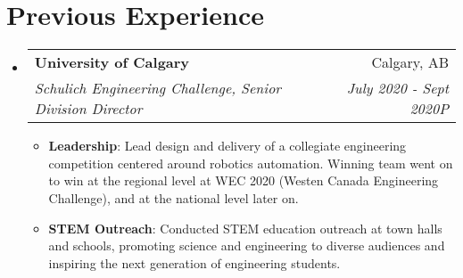 \documentclass[letterpaper,11pt]{article}
\makeatletter
\newcommand{\resumeItem}[2]{
  \item\small{
    \textbf{#1}{: #2 \vspace{-2pt}}
  }
}
\newcommand{\resumeSubheading}[4]{
  \vspace{-1pt}\item
    \begin{tabular*}{0.97\textwidth}[t]{l@{\extracolsep{\fill}}r}
      \textbf{#1} & #2 \\
      \textit{\small#3} & \textit{\small #4} \\
    \end{tabular*}\vspace{-5pt}
}
\newcommand{\resumeSubHeadingListStart}{\begin{itemize}[leftmargin=*]}
\newcommand{\resumeSubHeadingListEnd}{\end{itemize}}
\newcommand{\resumeItemListStart}{\begin{itemize}}
\newcommand{\resumeItemListEnd}{\end{itemize}\vspace{-5pt}}
\makeatother
\begin{document}
\section{Previous Experience}
  \resumeSubHeadingListStart
    \resumeSubheading
      {University of Calgary}{Calgary, AB}
      {Schulich Engineering Challenge, Senior Division Director}{July 2020 - Sept 2020P}
      \resumeItemListStart
        \resumeItem{Leadership}
          {Lead design and delivery of a collegiate engineering competition centered around robotics automation. Winning team went on to win at the regional level at WEC 2020 (Westen Canada Engineering Challenge), and at the national level later on.}
        \resumeItem{STEM Outreach}
          {Conducted STEM education outreach at town halls and schools, promoting science and engineering to diverse audiences and inspiring the next generation of engineering students.}
      \resumeItemListEnd


  \resumeSubHeadingListEnd


\end{document}

